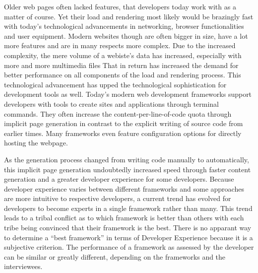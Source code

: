 \documentclass[a4paper, fontsize=11pt]{article}
\begin{document}
Older web pages often lacked features, that developers today work with as a matter of course.
Yet their load and rendering most likely would be brazingly fast with today's technological advancements in networking, browser functionalities and user equipment.
Modern websites though are often bigger in size, have a lot more features and are in many respects more complex.
Due to the increased complexity, the mere volume of a webiste's data has increased, especially with more and more multimedia files
That in return has increased the demand for better performance on all components of the load and rendering process.
This technological advancement has upped the technological sophistication for development tools as well.
Today's modern web development frameworks support developers with tools to create sites and applications through terminal commands.
They often increase the content-per-line-of-code quota through implicit page generation in contrast to the explicit writing of source code from earlier times.
Many frameworks even feature configuration options for directly hosting the webpage.

As the generation process changed from writing code manually to automatically, this implicit page generation undoubtedly increased speed through faster content generation and a greater developer experience for some developers.
Because developer experience varies between different frameworks and some approaches are more intuitive to respective developers, a current trend has evolved for developers to become experts in a single framework rather than many.
This trend leads to a tribal conflict as to which framework is better than others with each tribe being convinced that their framework is the best.
There is no apparant way to determine a \enquote{best framework} in terms of Developer Experience because it is a subjective criterion.
The performance of a framework as assessed by the developer can be similar or greatly different, depending on the frameworks and the interviewees.
\end{document}
